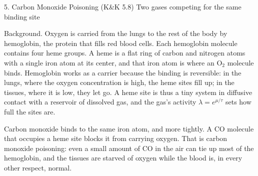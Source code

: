 \documentclass[11pt]{article}
\begin{document}
\begin{problem}{5. Carbon Monoxide Poisoning (K\&K 5.8)}
Two gases competing for the same binding site

Background.
Oxygen is carried from the lungs to the rest of the body by hemoglobin, the protein that fills red blood cells.
Each hemoglobin molecule contains four heme groups.
A heme is a flat ring of carbon and nitrogen atoms with a single iron atom at its center, and that iron atom is where an \(\mathrm{O}_2\) molecule binds.
Hemoglobin works as a carrier because the binding is reversible: in the lungs, where the oxygen concentration is high, the heme sites fill up; in the tissues, where it is low, they let go.
A heme site is thus a tiny system in diffusive contact with a reservoir of dissolved gas, and the gas's activity \(\lambda=e^{\mu/\tau}\) sets how full the sites are.

Carbon monoxide binds to the same iron atom, and more tightly.
A CO molecule that occupies a heme site blocks it from carrying oxygen.
That is carbon monoxide poisoning: even a small amount of CO in the air can tie up most of the hemoglobin, and the tissues are starved of oxygen while the blood is, in every other respect, normal.


\end{problem}
\end{document}
